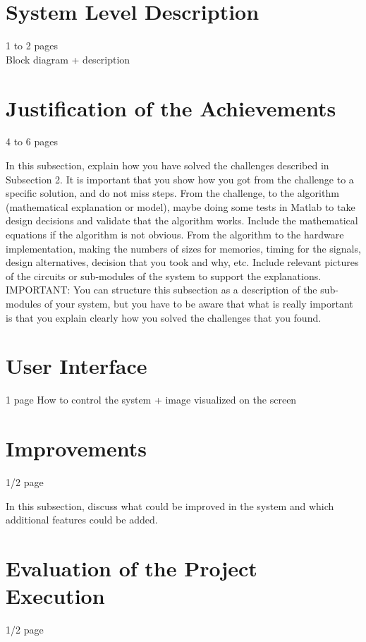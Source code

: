 \section{System Level Description}\label{cha:syslvl}

1 to 2 pages\\
Block diagram + description

\section{Justification of the Achievements}\label{cha:justice}

4 to 6 pages

In this subsection, explain how you have solved the challenges described in Subsection 2. It is important that you show how you got from the challenge to a specific solution, and do not miss steps. From the challenge, to the algorithm (mathematical explanation or model), maybe doing some tests in Matlab to take design decisions and validate that the algorithm works. Include the mathematical equations if the algorithm is not obvious. From the algorithm to the hardware implementation, making the numbers of sizes for memories, timing for the signals, design alternatives, decision that you took and why, etc. Include relevant pictures of the circuits or sub-modules of the system to support the explanations. IMPORTANT: You can structure this subsection as a description of the sub-modules of your system, but you have to be aware that what is really important is that you explain clearly how you solved the challenges that you found.
\section{User Interface}\label{cha:ui}

1 page
How to control the system + image visualized on the screen

\section{Improvements}\label{cha:improvements}

1/2 page

In this subsection, discuss what could be improved in the system and which additional features could be added.
\section{Evaluation of the Project Execution}\label{cha:eval}

1/2 page

